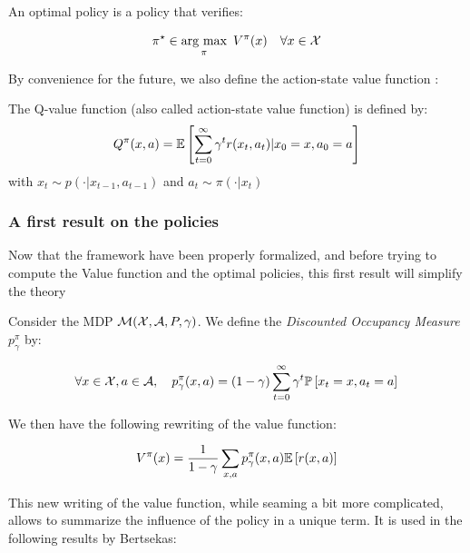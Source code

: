 \begin{definition}
    An optimal policy is a policy that verifies:

    \[ \pi^{\star} \in \operatorname*{\mbox{arg max}}_\pi \ V^\pi(x) \quad \forall x \in \mathcal{X} \]
\end{definition}

By convenience for the future, we also define the action-state value function :
\begin{definition}
    The  Q-value function (also called action-state value function) is defined by:
    \[ Q^\pi(x,a) = \mathbb{E}\left[ \sum_{t=0}^\infty  \gamma^t r(x_t, a_t) | x_0 = x, a_0 = a \right]  \] 
    with $x_t \sim p(\cdot | x_{t-1}, a_{t-1})$ and $a_t \sim \pi(\cdot | x_t)$
\end{definition}

\subsubsection*{A first result on the policies}

Now that the framework have been properly formalized, and before trying to compute the Value function and the optimal policies, this first result will simplify the theory

\begin{definition}
    Consider the MDP $\mathcal{M}(\mathcal{X}, \mathcal{A}, P, \gamma)$. We define the \emph{Discounted Occupancy Measure} $p_\gamma^\pi$ by:

    \[ \forall x \in \mathcal{X}, a \in \mathcal{A}, \quad p_\gamma^\pi(x,a) = (1-\gamma)\sum_{t=0}^\infty \gamma^t \mathbb{P}\left[x_t = x, a_t = a\right] \]

    We then have the following rewriting of the value function:

    \[ V^\pi(x) = \frac{1}{1-\gamma} \sum_{x,a} p_\gamma^\pi(x,a)\mathbb{E}\left[ r(x,a) \right] \]
\end{definition}

This new writing of the value function, while seaming a bit more complicated, allows to summarize the influence of the policy in a unique term. It is used in the following results by Bertsekas:
   
